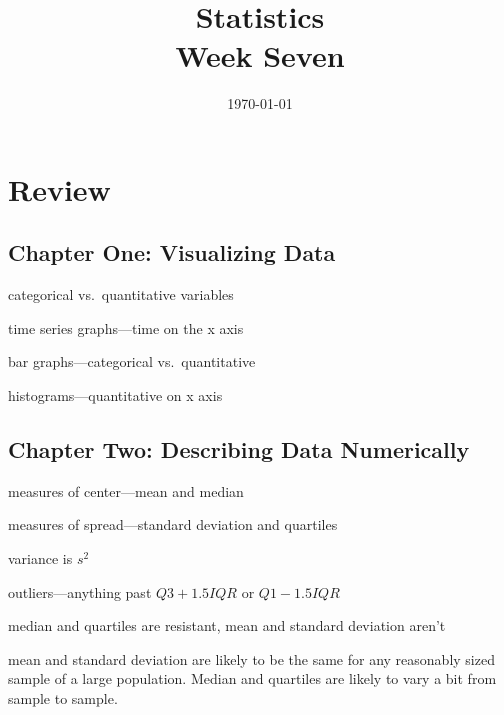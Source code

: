 \documentclass[letterpaper, landscape]{exam}
\title{Statistics \\ Week Seven}
\date{\today}
\author{}
\begin{document}
  \maketitle

  \section{Review}
  \subsection{Chapter One: Visualizing Data}
  \begin{itemize*}
    \item categorical vs.\ quantitative variables
    \item time series graphs---time on the x axis
    \item bar graphs---categorical vs.\ quantitative
    \item histograms---quantitative on x axis
  \end{itemize*}

  \subsection{Chapter Two: Describing Data Numerically}
  \begin{itemize*}
    \item measures of center---mean and median
    \item measures of spread---standard deviation and quartiles
    \item variance is $s^2$
    \item outliers---anything past $Q3 + 1.5 IQR$ or $Q1 - 1.5 IQR$
    \item median and quartiles are resistant, mean and standard deviation aren't
    \item mean and standard deviation are likely to be the same for any
      reasonably sized sample of a large population.  Median and quartiles are
      likely to vary a bit from sample to sample.
  \end{itemize*}
\end{document}
